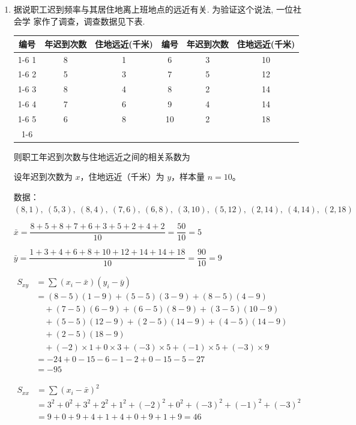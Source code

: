 \begin{enumerate}
    \item 据说职工迟到频率与其居住地离上班地点的远近有关. 为验证这个说法, 一位社会学 家作了调查，调查数据见下表.
    
    \begin{center}
    \begin{tabular}{|c|c|c|c|c|c|}
    \hline
    编号 & 年迟到次数 & 住地远近(千米) & 编号 & 年迟到次数 & 住地远近(千米) \\
    \cline{1-6}
    1 & 8 & 1 & 6 & 3 & 10 \\
    \cline{1-6}
    2 & 5 & 3 & 7 & 5 & 12 \\
    \cline{1-6}
    3 & 8 & 4 & 8 & 2 & 14 \\
    \cline{1-6}
    4 & 7 & 6 & 9 & 4 & 14 \\
    \cline{1-6}
    5 & 6 & 8 & 10 & 2 & 18 \\
    \cline{1-6}
    \hline
    \end{tabular}
    \end{center}
    
    则职工年迟到次数与住地远近之间的相关系数为
    \begin{jieda}
        设年迟到次数为 $x$，住地远近（千米）为 $y$，样本量 $n=10$。

数据：
$
(8,1),\ (5,3),\ (8,4),\ (7,6),\ (6,8),\ (3,10),\ (5,12),\ (2,14),\ (4,14),\ (2,18)
$

$
\bar{x} = \dfrac{8+5+8+7+6+3+5+2+4+2}{10} = \dfrac{50}{10} = 5
$

$
\bar{y} = \dfrac{1+3+4+6+8+10+12+14+14+18}{10} = \dfrac{90}{10} = 9
$

$
\begin{aligned}
S_{xy} &= \sum (x_i - \bar{x})(y_i - \bar{y}) \\
&= (8-5)(1-9) + (5-5)(3-9) + (8-5)(4-9) \\
&\quad + (7-5)(6-9) + (6-5)(8-9) + (3-5)(10-9) \\
&\quad + (5-5)(12-9) + (2-5)(14-9) + (4-5)(14-9) \\
&\quad + (2-5)(18-9) \\
&\quad + (-2)\times1 + 0\times3 + (-3)\times5 + (-1)\times5 + (-3)\times9 \\
&= -24 + 0 -15 -6 -1 -2 + 0 -15 -5 -27 \\
&= -95
\end{aligned}
$

$
\begin{aligned}
S_{xx} &= \sum (x_i - \bar{x})^2 \\
&= 3^2 + 0^2 + 3^2 + 2^2 + 1^2 + (-2)^2 + 0^2 + (-3)^2 + (-1)^2 + (-3)^2 \\
&= 9+0+9+4+1+4+0+9+1+9 = 46
\end{aligned}
$


\end{jieda}
\end{enumerate}
